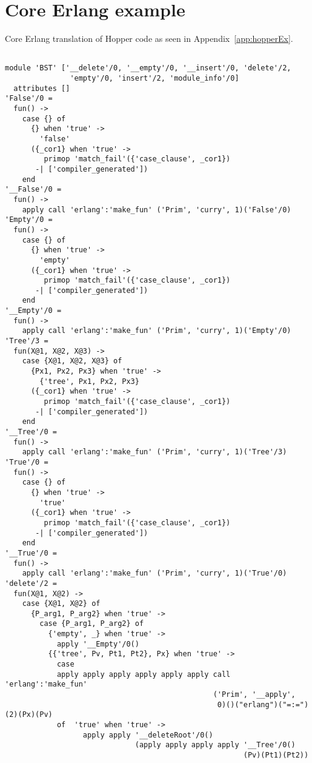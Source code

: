 \chapter{Core Erlang example} \label{app:coreEx}

Core Erlang translation of Hopper code as seen in Appendix~\ref{app:hopperEx}.

\lstset{basicstyle=\ttfamily\scriptsize}

\begin{lstlisting} 

module 'BST' ['__delete'/0, '__empty'/0, '__insert'/0, 'delete'/2,
               'empty'/0, 'insert'/2, 'module_info'/0]
  attributes []
'False'/0 =
  fun() ->
    case {} of
      {} when 'true' ->
        'false'
      ({_cor1} when 'true' ->
         primop 'match_fail'({'case_clause', _cor1})
       -| ['compiler_generated'])
    end
'__False'/0 =
  fun() ->
    apply call 'erlang':'make_fun' ('Prim', 'curry', 1)('False'/0)
'Empty'/0 =
  fun() ->
    case {} of
      {} when 'true' ->
        'empty'
      ({_cor1} when 'true' ->
         primop 'match_fail'({'case_clause', _cor1})
       -| ['compiler_generated'])
    end
'__Empty'/0 =
  fun() ->
    apply call 'erlang':'make_fun' ('Prim', 'curry', 1)('Empty'/0)
'Tree'/3 =
  fun(X@1, X@2, X@3) ->
    case {X@1, X@2, X@3} of
      {Px1, Px2, Px3} when 'true' ->
        {'tree', Px1, Px2, Px3}
      ({_cor1} when 'true' ->
         primop 'match_fail'({'case_clause', _cor1})
       -| ['compiler_generated'])
    end
'__Tree'/0 =
  fun() ->
    apply call 'erlang':'make_fun' ('Prim', 'curry', 1)('Tree'/3)
'True'/0 =
  fun() ->
    case {} of
      {} when 'true' ->
        'true'
      ({_cor1} when 'true' ->
         primop 'match_fail'({'case_clause', _cor1})
       -| ['compiler_generated'])
    end
'__True'/0 =
  fun() ->
    apply call 'erlang':'make_fun' ('Prim', 'curry', 1)('True'/0)
'delete'/2 =
  fun(X@1, X@2) ->
    case {X@1, X@2} of
      {P_arg1, P_arg2} when 'true' ->
        case {P_arg1, P_arg2} of
          {'empty', _} when 'true' ->
            apply '__Empty'/0()
          {{'tree', Pv, Pt1, Pt2}, Px} when 'true' ->
            case
            apply apply apply apply apply apply call 'erlang':'make_fun'
                                                ('Prim', '__apply',
                                                 0)()("erlang")("=:=")(2)(Px)(Pv)
            of  'true' when 'true' ->
                  apply apply '__deleteRoot'/0()
                              (apply apply apply apply '__Tree'/0()
                                                       (Pv)(Pt1)(Pt2))

\end{lstlisting}
